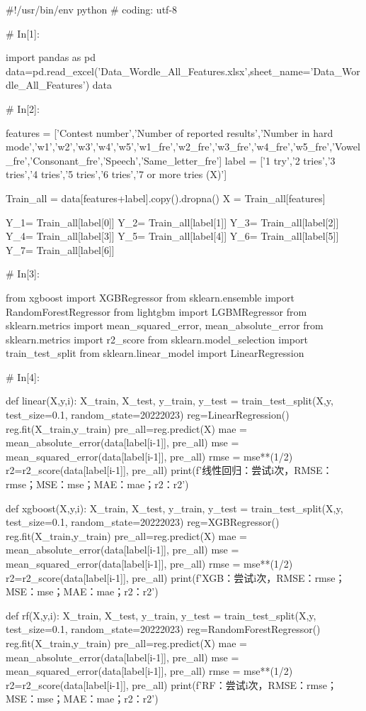\documentclass{MathModeling}
\begin{document}
\begin{python}
#!/usr/bin/env python
# coding: utf-8

# In[1]:


import pandas as pd
data=pd.read_excel('Data_Wordle_All_Features.xlsx',sheet_name='Data_Wordle_All_Features')
data


# In[2]:


features = ['Contest number','Number of reported results','Number in hard mode','w1','w2','w3','w4','w5','w1_fre','w2_fre','w3_fre','w4_fre','w5_fre','Vowel_fre','Consonant_fre','Speech','Same_letter_fre']
label = ['1 try','2 tries','3 tries','4 tries','5 tries','6 tries','7 or more tries (X)']

Train_all = data[features+label].copy().dropna()
X = Train_all[features]

Y_1= Train_all[label[0]]
Y_2= Train_all[label[1]]
Y_3= Train_all[label[2]]
Y_4= Train_all[label[3]]
Y_5= Train_all[label[4]]
Y_6= Train_all[label[5]]
Y_7= Train_all[label[6]]


# In[3]:


from xgboost import XGBRegressor
from sklearn.ensemble import RandomForestRegressor
from lightgbm import LGBMRegressor
from sklearn.metrics import mean_squared_error, mean_absolute_error
from sklearn.metrics import r2_score
from sklearn.model_selection import train_test_split
from sklearn.linear_model import LinearRegression


# In[4]:


def linear(X,y,i):
    X_train, X_test, y_train, y_test = train_test_split(X,y, test_size=0.1, random_state=20222023)
    reg=LinearRegression()
    reg.fit(X_train,y_train)
    pre_all=reg.predict(X)
    mae = mean_absolute_error(data[label[i-1]], pre_all)
    mse = mean_squared_error(data[label[i-1]], pre_all)
    rmse = mse**(1/2)
    r2=r2_score(data[label[i-1]], pre_all)
    print(f'线性回归：尝试{i}次，RMSE：{rmse}；MSE：{mse}；MAE：{mae}；r2：{r2}')


def xgboost(X,y,i):
    X_train, X_test, y_train, y_test = train_test_split(X,y, test_size=0.1, random_state=20222023)
    reg=XGBRegressor()
    reg.fit(X_train,y_train)
    pre_all=reg.predict(X)
    mae = mean_absolute_error(data[label[i-1]], pre_all)
    mse = mean_squared_error(data[label[i-1]], pre_all)
    rmse = mse**(1/2)
    r2=r2_score(data[label[i-1]], pre_all)
    print(f'XGB：尝试{i}次，RMSE：{rmse}；MSE：{mse}；MAE：{mae}；r2：{r2}')


def rf(X,y,i):
    X_train, X_test, y_train, y_test = train_test_split(X,y, test_size=0.1, random_state=20222023)
    reg=RandomForestRegressor()
    reg.fit(X_train,y_train)
    pre_all=reg.predict(X)
    mae = mean_absolute_error(data[label[i-1]], pre_all)
    mse = mean_squared_error(data[label[i-1]], pre_all)
    rmse = mse**(1/2)
    r2=r2_score(data[label[i-1]], pre_all)
    print(f'RF：尝试{i}次，RMSE：{rmse}；MSE：{mse}；MAE：{mae}；r2：{r2}')



\end{python}
\end{document}
